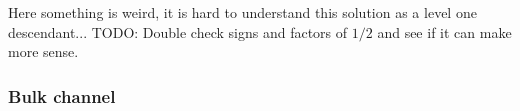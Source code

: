 \documentclass[letterpaper]{article}
\let\Oldsubsubsection\subsubsection
\renewcommand{\subsubsection}{\FloatBarrier\Oldsubsubsection}
\def\Om{{\mathcal{O}}}
\begin{document}
Here something is weird, it is hard to understand this solution as a level one descendant... TODO: Double check signs and factors of $1/2$ and see if it can make more sense.

% 
% 


\subsubsection{Bulk channel}
\end{document}
